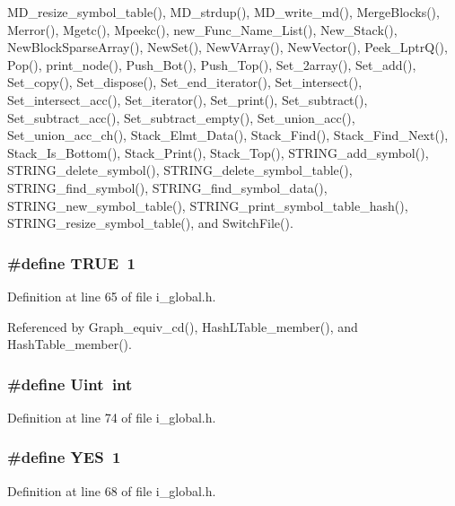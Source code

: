 MD\_\-resize\_\-symbol\_\-table(), MD\_\-strdup(), MD\_\-write\_\-md(), Merge\-Blocks(), Merror(), Mgetc(), Mpeekc(), new\_\-Func\_\-Name\_\-List(), New\_\-Stack(), New\-Block\-Sparse\-Array(), New\-Set(), New\-VArray(), New\-Vector(), Peek\_\-Lptr\-Q(), Pop(), print\_\-node(), Push\_\-Bot(), Push\_\-Top(), Set\_\-2array(), Set\_\-add(), Set\_\-copy(), Set\_\-dispose(), Set\_\-end\_\-iterator(), Set\_\-intersect(), Set\_\-intersect\_\-acc(), Set\_\-iterator(), Set\_\-print(), Set\_\-subtract(), Set\_\-subtract\_\-acc(), Set\_\-subtract\_\-empty(), Set\_\-union\_\-acc(), Set\_\-union\_\-acc\_\-ch(), Stack\_\-Elmt\_\-Data(), Stack\_\-Find(), Stack\_\-Find\_\-Next(), Stack\_\-Is\_\-Bottom(), Stack\_\-Print(), Stack\_\-Top(), STRING\_\-add\_\-symbol(), STRING\_\-delete\_\-symbol(), STRING\_\-delete\_\-symbol\_\-table(), STRING\_\-find\_\-symbol(), STRING\_\-find\_\-symbol\_\-data(), STRING\_\-new\_\-symbol\_\-table(), STRING\_\-print\_\-symbol\_\-table\_\-hash(), STRING\_\-resize\_\-symbol\_\-table(), and Switch\-File().
\subsubsection{\setlength{\rightskip}{0pt plus 5cm}\#define TRUE~1}\label{i__global_8h_a8cecfc5c5c054d2875c03e77b7be15d}




Definition at line 65 of file i\_\-global.h.

Referenced by Graph\_\-equiv\_\-cd(), Hash\-LTable\_\-member(), and Hash\-Table\_\-member().
\subsubsection{\setlength{\rightskip}{0pt plus 5cm}\#define Uint~int}\label{i__global_8h_3646e00ae8dc6228964a0f7f2b63028d}




Definition at line 74 of file i\_\-global.h.
\subsubsection{\setlength{\rightskip}{0pt plus 5cm}\#define YES~1}\label{i__global_8h_7ebc9a785e5ab85457c98595aac81589}




Definition at line 68 of file i\_\-global.h.